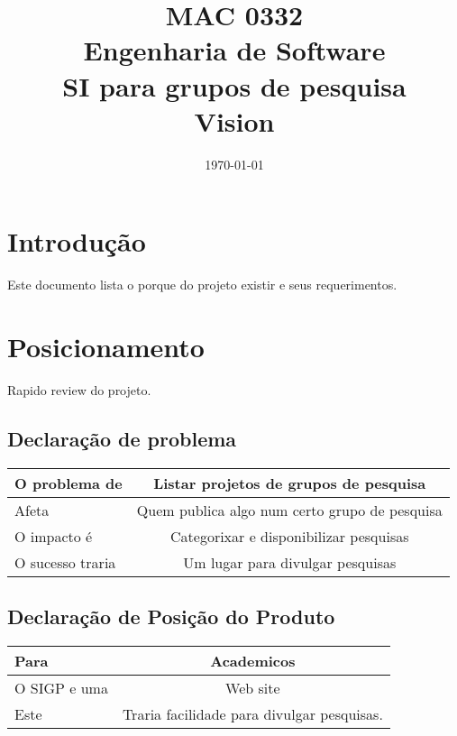 \documentclass[11pt, a4paper]{article}
\title{MAC 0332\\
	Engenharia de Software\\
	SI para grupos de pesquisa\\
	Vision}
\date{\today}
\begin{document}
	\maketitle
	\newpage
    \section{Introdução}
        Este documento lista o porque do projeto existir e seus requerimentos.
    
    \section{Posicionamento}
        Rapido review do projeto.
        
        \subsection{Declaração de problema}
            \begin{tabular}{| l | c |}
                \hline                       
                O problema de & Listar projetos de grupos de pesquisa \\ \hline
                Afeta & Quem publica algo num certo grupo de pesquisa \\ \hline
                O impacto é & Categorixar e disponibilizar pesquisas \\ \hline
                O sucesso traria & Um lugar para divulgar pesquisas \\
                \hline  
            \end{tabular}
        
        \subsection{Declaração de Posição do Produto}
            \begin{tabular}{| l | c |}
                \hline                       
                Para & Academicos \\ \hline
                O SIGP e uma & Web site \\ \hline
                Este & Traria facilidade para divulgar pesquisas. \\
                \hline
            \end{tabular}
\end{document}
